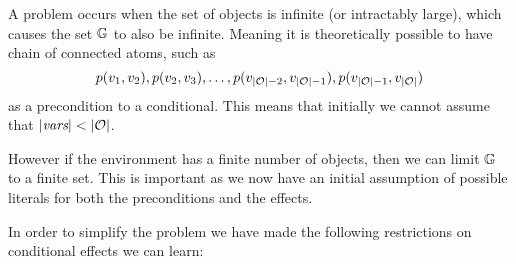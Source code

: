 \documentclass[\master/Master.tex]{subfiles}
\begin{document}
A problem occurs when the set of objects \objs is infinite (or intractably large), which causes the set $\mathbb{G}$ to also be infinite.
Meaning it is theoretically possible to have chain of connected atoms, such as 
\begin{equation*}
	p(v_1,v_2), p(v_2,v_3),\dots, p(v_{|\mathcal{O}|-2},v_{|\mathcal{O}|-1}), p(v_{|\mathcal{O}|-1},v_{|\mathcal{O}|})
\end{equation*}
 as a precondition to a conditional.
This means that initially we cannot assume that $|\textit{vars}| < |\mathcal{O}|$.

However if the environment has a finite number of objects, then we can limit $\mathbb{G}$ to a finite set.
This is important as we now have an initial assumption of possible literals for both the preconditions and the effects.

In order to simplify the problem we have made the following restrictions on conditional effects we can learn:

\end{document}
